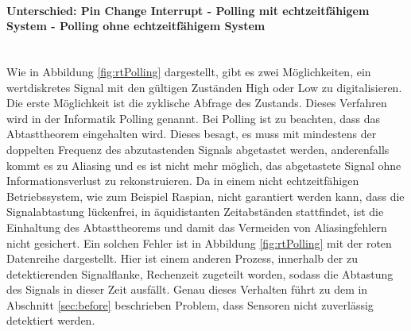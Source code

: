 \documentclass[a4paper, 11pt]{report}
\begin{document}
				\paragraph{Unterschied: Pin Change Interrupt - Polling mit echtzeitfähigem System - Polling ohne echtzeitfähigem System}\mbox{}\\
					Wie in Abbildung \ref{fig:rtPolling} dargestellt, gibt es zwei Möglichkeiten, ein wertdiskretes Signal mit den gültigen Zuständen High oder Low zu digitalisieren.
					Die erste Möglichkeit ist die zyklische Abfrage des Zustands. Dieses Verfahren wird in der Informatik Polling genannt.
					Bei Polling ist zu beachten, dass das Abtasttheorem eingehalten wird. 
					Dieses besagt, es muss mit mindestens der doppelten Frequenz des abzutastenden Signals abgetastet werden, 
					anderenfalls kommt es zu Aliasing und es ist nicht mehr möglich, das abgetastete Signal ohne Informationsverlust zu rekonstruieren.
					Da in einem nicht echtzeitfähigen Betriebssystem, wie zum Beispiel Raspian, nicht garantiert werden kann, 
					dass die Signalabtastung lückenfrei, in äquidistanten Zeitabständen stattfindet,
					ist die Einhaltung des Abtasttheorems und damit das Vermeiden von Aliasingfehlern nicht gesichert.
					Ein solchen Fehler ist in Abbildung \ref{fig:rtPolling} mit der roten Datenreihe dargestellt. Hier ist einem anderen Prozess, 
					innerhalb der zu detektierenden Signalflanke, Rechenzeit zugeteilt worden, sodass die Abtastung des Signals in dieser Zeit ausfällt.
					Genau dieses Verhalten führt zu dem in Abschnitt \ref{sec:before} beschrieben Problem, dass Sensoren nicht zuverlässig detektiert werden.
\end{document}
